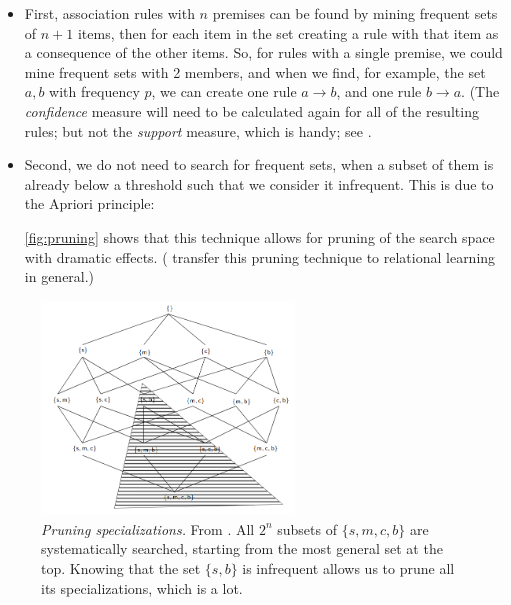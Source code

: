 \begin{itemize}
    \item First, association rules with $n$ premises can be found by mining frequent sets of $n + 1$ items, then for each item in the set creating a rule with that item as a consequence of the other items. So, for rules with a single premise, we could mine frequent sets with 2 members, and when we find, for example, the set ${a, b}$ with frequency $p$, we can create one rule $a \rightarrow b$, and one rule $b \rightarrow a$. (The \textit{confidence} measure will need to be calculated again for all of the resulting rules; but not the \textit{support} measure, which is handy; see \citet[p.~350]{tanIntroductionDataMining2014}.
    
    \item Second, we do not need to search for frequent sets, when a subset of them is already below a threshold such that we consider it infrequent. This is due to the Apriori principle:  \citep[p.~333]{tanIntroductionDataMining2014} 
    
    \autoref{fig:pruning} shows that this technique allows for pruning of the search space with dramatic effects. (\citet{deraedtLogicalRelationalLearning2008} transfer this pruning technique to relational learning in general.)
\end{itemize}

\begin{figure}[htb]
        \centering
        \includegraphics[width=0.6\textwidth]{images/pruning.png}
        \caption{\textit{Pruning specializations.} From \citet[p.~52]{deraedtLogicalRelationalLearning2008}. All $2^n$ subsets of $\{s, m, c, b\}$ are systematically searched, starting from the most general set at the top. Knowing that the set $\{s, b\}$ is infrequent allows us to prune all its specializations, which is a lot. }
        \label{fig:pruning}
\end{figure}

